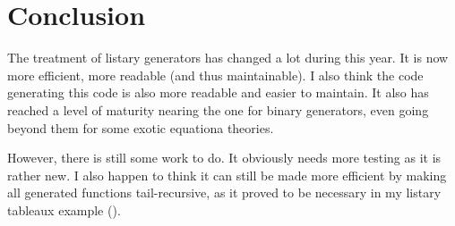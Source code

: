 \section{Conclusion}

The treatment of listary generators has changed a lot during this
year. It is now more efficient, more readable (and thus
maintainable). I also think the code generating this code is also more
readable and easier to maintain. It also has reached a level of
maturity nearing the one for binary generators, even going beyond them
for some exotic equationa theories.

However, there is still some work to do. It obviously needs more
testing as it is rather new. I also happen to think it can still be
made more efficient by making all generated functions tail-recursive,
as it proved to be necessary in my listary tableaux example
(). 


